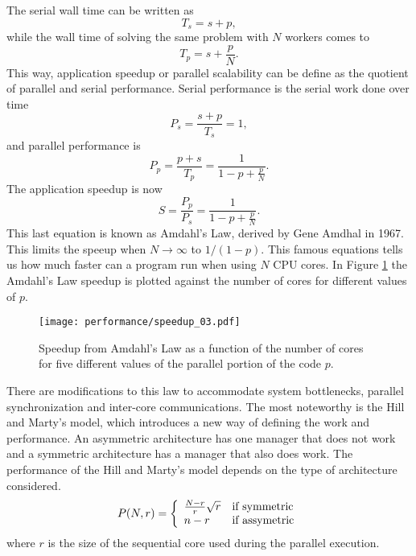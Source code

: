 	The serial wall time can be written as
\begin{equation}
	T_s = s + p,
\end{equation}	
while the wall time of solving the same problem with $N$ workers comes to
\begin{equation}
	T_p = s + \frac{p}{N}.
\end{equation}
This way, application speedup or parallel scalability can be define as the quotient of parallel and serial performance. Serial performance is the serial work done over time
\begin{equation}
	P_s = \frac{s+p}{T_s} = 1,
\end{equation} 
and parallel performance is
\begin{equation}
	P_p = \frac{p+s}{T_p} = \frac{1}{1-p+\frac{p}{N}}.
\end{equation}
The application speedup is now
\begin{equation}
	S = \frac{P_p}{P_s} = \frac{1}{1-p+\frac{p}{N}}.
\end{equation}
This last equation is known as Amdahl's Law, derived by Gene Amdhal in 1967. This limits the speeup when $N \rightarrow \infty$ to $1/(1-p)$. This famous equations tells us how much faster can a program run when using $N$ CPU cores. In Figure \ref{amd_law} the Amdahl's Law speedup is plotted against the number of cores for different values of $p$.
\begin{figure}[h]
	\centering
	\texttt{[image: performance/speedup\_03.pdf]}
	\caption{Speedup from Amdahl's Law as a function of the number of cores for five different values of the parallel portion of the code $p$.}
	\label{amd_law}
\end{figure}

	There are modifications to this law to accommodate system bottlenecks, parallel synchronization and inter-core communications. The most noteworthy is the Hill and Marty's model, which introduces a new way of defining the work and performance. An asymmetric architecture has one manager that does not work and a symmetric architecture has a manager that also does work. The performance of the Hill and Marty's model depends on the type of architecture considered. 
\begin{equation}
		P(N, r) = \left\{ \begin{array}{ll}  \frac{N-r}{r} \sqrt{r}  & \mbox{if } \text{symmetric} \\ n-r & \mbox{if } \text{assymetric} \end{array} \right.
\end{equation}
where $r$ is the size of the sequential core used during the parallel execution.

